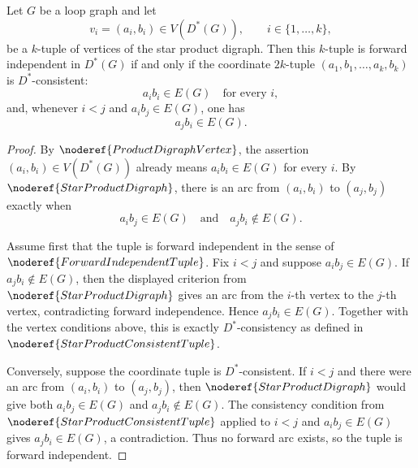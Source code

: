 \begin{helper}
Let \(G\) be a loop graph and let
\[
  v_i=(a_i,b_i)\in V(D^*(G)),\qquad i\in\{1,\ldots,k\},
\]
be a \(k\)-tuple of vertices of the star product digraph.  Then this
\(k\)-tuple is forward independent in \(D^*(G)\) if and only if the
coordinate \(2k\)-tuple \((a_1,b_1,\ldots,a_k,b_k)\) is \(D^*\)-consistent:
\[
  a_i b_i\in E(G)\quad\text{for every }i,
\]
and, whenever \(i<j\) and \(a_i b_j\in E(G)\), one has
\[
  a_j b_i\in E(G).
\]
\end{helper}
\begin{proof}
By \(\noderef{ProductDigraphVertex}\), the assertion
\((a_i,b_i)\in V(D^*(G))\) already means \(a_i b_i\in E(G)\) for every
\(i\).  By \(\noderef{StarProductDigraph}\), there is an arc from
\((a_i,b_i)\) to \((a_j,b_j)\) exactly when
\[
  a_i b_j\in E(G)\quad\text{and}\quad a_j b_i\notin E(G).
\]

Assume first that the tuple is forward independent in the sense of
\(\noderef{ForwardIndependentTuple}\).  Fix \(i<j\) and suppose
\(a_i b_j\in E(G)\).  If \(a_j b_i\notin E(G)\), then the displayed
criterion from \(\noderef{StarProductDigraph}\) gives an arc from the
\(i\)-th vertex to the \(j\)-th vertex, contradicting forward independence.
Hence \(a_j b_i\in E(G)\).  Together with the vertex conditions above, this
is exactly \(D^*\)-consistency as defined in
\(\noderef{StarProductConsistentTuple}\).

Conversely, suppose the coordinate tuple is \(D^*\)-consistent.  If
\(i<j\) and there were an arc from \((a_i,b_i)\) to \((a_j,b_j)\), then
\(\noderef{StarProductDigraph}\) would give both \(a_i b_j\in E(G)\) and
\(a_j b_i\notin E(G)\).  The consistency condition from
\(\noderef{StarProductConsistentTuple}\) applied to \(i<j\) and
\(a_i b_j\in E(G)\) gives \(a_j b_i\in E(G)\), a contradiction.  Thus no
forward arc exists, so the tuple is forward independent.
\end{proof}
